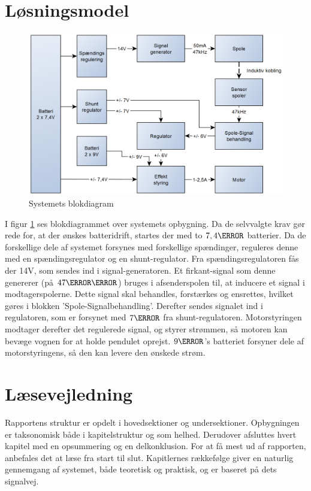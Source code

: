 \section{Løsningsmodel}
\begin{figure}[h!]
	\centering
	\includegraphics[width=.9\textwidth]{diagram/blokdiagram1.png}
	\caption{Systemets blokdiagram}
	\label{fig:blockdiagram1}
\end{figure}
\FloatBlock
I figur \ref{fig:blockdiagram1} ses blokdiagrammet over systemets opbygning. 
Da de selvvalgte krav gør rede for, at der ønskes batteridrift, startes der med to $7,4\volt$ batterier. 
Da de forskellige dele af systemet forsynes med forskellige spændinger, reguleres denne med en spændingsregulator og en shunt-regulator. Fra spændingsregulatoren fås der 14V, som sendes ind i signal-generatoren. 
Et firkant-signal som denne genererer (på $47\kilo\hertz$) bruges i afsenderspolen til, at inducere et signal i modtagerspolerne. 
Dette signal skal behandles, forstærkes og ensrettes, hvilket gøres i blokken 'Spole-Signalbehandling'.
Derefter sendes signalet ind i regulatoren, som er forsynet med $7\volt$ fra shunt-regulatoren. 
Motorstyringen modtager derefter det regulerede signal, og styrer strømmen, så motoren kan bevæge vognen for at holde pendulet oprejst. 
$9\volt$'s batteriet forsyner dele af motorstyringens, så den kan levere den ønskede strøm. 

\section{Læsevejledning}
Rapportens struktur er opdelt i hovedsektioner og undersektioner.
Opbygningen er taksonomisk både i kapitelstruktur og som helhed. 
Derudover afsluttes hvert kapitel med en opsummering og en delkonklusion.
For at få mest ud af rapporten, anbefales det at læse fra start til slut.
Kapitlernes rækkefølge giver en naturlig gennemgang af systemet, både teoretisk og praktisk, og er baseret på dets signalvej.

